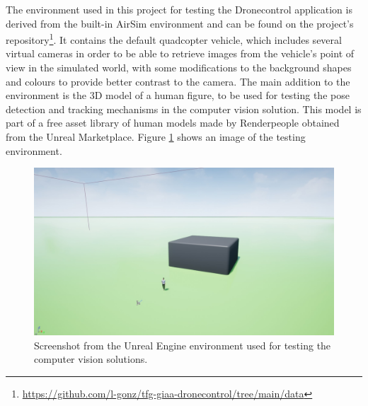 The environment used in this project for testing the Dronecontrol application is derived from the built-in AirSim environment and can be found on the project's repository\footnote{\url{https://github.com/l-gonz/tfg-giaa-dronecontrol/tree/main/data}}.
It contains the default quadcopter vehicle, which includes several virtual cameras in order to be able to retrieve images from the vehicle's point of view in the simulated world, with some modifications to the background shapes and colours to provide better contrast to the camera.
The main addition to the environment is the 3D model of a human figure, to be used for testing the pose detection and tracking mechanisms in the computer vision solution.
This model is part of a free asset library of human models made by Renderpeople \cite{render-people} obtained from the Unreal Marketplace.
Figure \ref{fig:unreal-env} shows an image of the testing environment.


\begin{figure}
  \centering
  \includegraphics[width=\textwidth,keepaspectratio]{img/unreal-env.jpg}
  \caption{Screenshot from the Unreal Engine environment used for testing the computer vision solutions.}
  \label{fig:unreal-env}
\end{figure}


